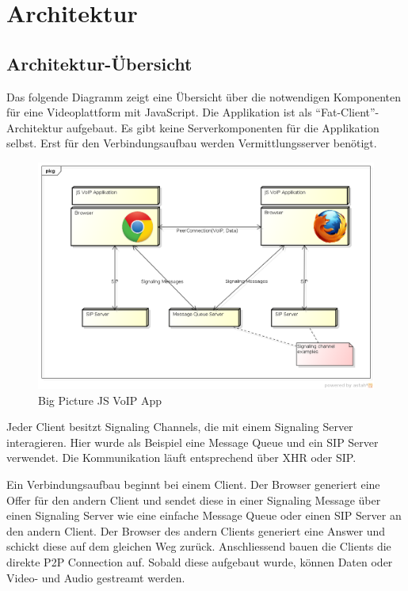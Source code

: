 \chapter{Architektur}

\section{Architektur-Übersicht}
	Das folgende Diagramm zeigt eine Übersicht über die notwendigen Komponenten für eine Videoplattform mit JavaScript. Die Applikation ist als "`Fat-Client"'-Architektur aufgebaut. Es gibt keine Serverkomponenten für die Applikation selbst. Erst für den Verbindungsaufbau werden Vermittlungsserver benötigt.
	\begin{figure}[H]
		\centering
		\includegraphics[width=1\textwidth]{../architekturanalayse/img/bigPicture.png}
		\caption{Big Picture JS VoIP App}
	\end{figure}
	
	Jeder Client besitzt Signaling Channels, die mit einem Signaling Server interagieren. Hier wurde als Beispiel eine Message Queue und ein SIP Server verwendet. Die Kommunikation läuft entsprechend über XHR oder SIP.
		
	Ein Verbindungsaufbau beginnt bei einem Client. Der Browser generiert eine Offer für den andern Client und sendet diese in einer Signaling Message über einen Signaling Server wie eine einfache Message Queue oder einen SIP Server an den andern Client. Der Browser des andern Clients generiert eine Answer und schickt diese auf dem gleichen Weg zurück. Anschliessend bauen die Clients die direkte P2P Connection auf. Sobald diese aufgebaut wurde, können Daten oder Video- und Audio gestreamt werden.
	
